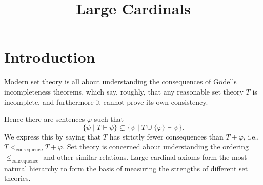 \documentclass{report}
\theoremstyle{definition}
\theoremstyle{plain}
\theoremstyle{definition}
\begin{document}
	\title{Large Cardinals}
	\maketitle
	\section{Introduction}
	Modern set theory is all about understanding the consequences of Gödel's incompleteness theorems, which say, roughly, that any reasonable set theory $T$ is incomplete, and furthermore it cannot prove its own consistency.
	
	Hence there are sentences $\varphi$ such that
	\[
		\{\psi \mid T\vdash \psi\} \subsetneq \{\psi \mid T \cup \{\varphi\} \vdash \psi\}.
	\]
	We express this by saying that $T$ has strictly fewer consequences than $T+\varphi$, i.e., $T<_{\text{consequence}} T+\varphi$. Set theory is concerned about understanding the ordering $\leq_{\text{consequence}}$ and other similar relations. Large cardinal axioms form the most natural hierarchy to form the basis of measuring the strengths of different set theories.
	
\end{document}
